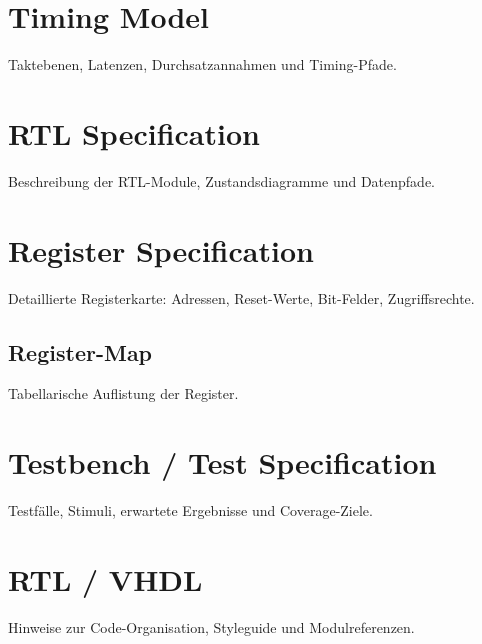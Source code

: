 \documentclass[12pt,a4paper,bibliography=totoc,listof=totoc]{scrartcl}
\begin{document}
\section{Timing Model}
Taktebenen, Latenzen, Durchsatzannahmen und Timing-Pfade.

\section{RTL Specification}
Beschreibung der RTL-Module, Zustandsdiagramme und Datenpfade.

\section{Register Specification}
Detaillierte Registerkarte: Adressen, Reset-Werte, Bit-Felder, Zugriffsrechte.
\subsection{Register-Map}
Tabellarische Auflistung der Register.

\section{Testbench / Test Specification}
Testfälle, Stimuli, erwartete Ergebnisse und Coverage-Ziele.

\section{RTL / VHDL}
Hinweise zur Code-Organisation, Styleguide und Modulreferenzen.
\end{document}
